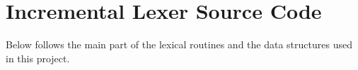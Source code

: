\chapter{Incremental Lexer Source Code}
Below follows the main part of the lexical routines and the data structures used in this project.

